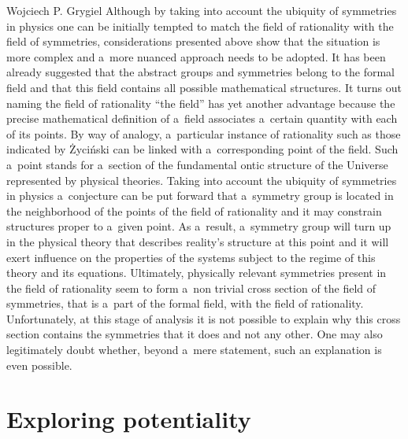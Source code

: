\begin{artengenv}{Wojciech P. Grygiel}
Although by taking into account the ubiquity of symmetries in physics one can be initially tempted to match the field of rationality with the field of symmetries, considerations presented above show that the situation is more complex and a~more nuanced approach needs to be adopted. It has been already suggested that the abstract groups and symmetries belong to the formal field and that this field contains all possible mathematical structures. It turns out naming the field of rationality ``the field'' has yet another advantage because the precise mathematical definition of a~field associates a~certain quantity with each of its points. By way of analogy, a~particular instance of rationality such as those indicated by Życiński can be linked with a~corresponding point of the field. Such a~point stands for a~section of the fundamental ontic structure of the Universe represented by physical theories. Taking into account the ubiquity of symmetries in physics a~conjecture can be put forward that a~symmetry group is located in the neighborhood of the points of the field of rationality and it may constrain structures proper to a~given point. As a~result, a~symmetry group will turn up in the physical theory that describes reality's structure at this point and it will exert influence on the properties of the systems subject to the regime of this theory and its equations. Ultimately, physically relevant symmetries present in the field of rationality seem to form a~non trivial cross section of the field of symmetries, that is a~part of the formal field, with the field of rationality. Unfortunately, at this stage of analysis it is not possible to explain why this cross section contains the symmetries that it does and not any other. One may also legitimately doubt whether, beyond a~mere statement, such an explanation is even possible.



\section*{Exploring potentiality}


\end{artengenv}
